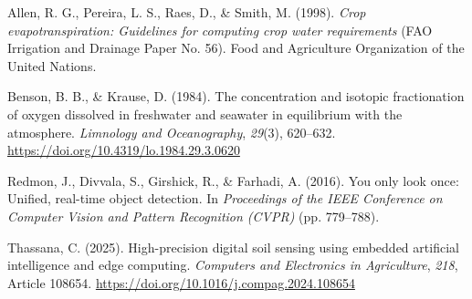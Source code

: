 \vspace{0.3cm}
\noindent\hangindent=1.25cm
Allen, R. G., Pereira, L. S., Raes, D., \& Smith, M. (1998). \textit{Crop evapotranspiration: Guidelines for computing crop water requirements} (FAO Irrigation and Drainage Paper No. 56). Food and Agriculture Organization of the United Nations.

\vspace{0.3cm}
\noindent\hangindent=1.25cm
Benson, B. B., \& Krause, D. (1984). The concentration and isotopic fractionation of oxygen dissolved in freshwater and seawater in equilibrium with the atmosphere. \textit{Limnology and Oceanography}, \textit{29}(3), 620--632. \url{https://doi.org/10.4319/lo.1984.29.3.0620}

\vspace{0.3cm}
\noindent\hangindent=1.25cm
Redmon, J., Divvala, S., Girshick, R., \& Farhadi, A. (2016). You only look once: Unified, real-time object detection. In \textit{Proceedings of the IEEE Conference on Computer Vision and Pattern Recognition (CVPR)} (pp. 779--788).

\vspace{0.3cm}
\noindent\hangindent=1.25cm
Thassana, C. (2025). High-precision digital soil sensing using embedded artificial intelligence and edge computing. \textit{Computers and Electronics in Agriculture}, \textit{218}, Article 108654. \url{https://doi.org/10.1016/j.compag.2024.108654}
\clearpage
